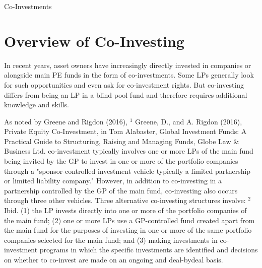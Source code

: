 \documentclass[11pt]{article}
\begin{document}
Co-Investments

\section*{Overview of Co-Investing}
In recent years, asset owners have increasingly directly invested in companies or alongside main PE funds in the form of co-investments. Some LPs generally look for such opportunities and even ask for co-investment rights. But co-investing differs from being an LP in a blind pool fund and therefore requires additional knowledge and skills.

As noted by Greene and Rigdon (2016), ${ }^{1}$ Greene, D., and A. Rigdon (2016), Private Equity Co-Investment, in Tom Alabaster, Global Investment Funds: A Practical Guide to Structuring, Raising and Managing Funds, Globe Law \& Business Ltd. co-investment typically involves one or more LPs of the main fund being invited by the GP to invest in one or more of the portfolio companies through a "sponsor-controlled investment vehicle typically a limited partnership or limited liability company." However, in addition to co-investing in a partnership controlled by the GP of the main fund, co-investing also occurs through three other vehicles. Three alternative co-investing structures involve: ${ }^{2}$ Ibid. (1) the LP invests directly into one or more of the portfolio companies of the main fund; (2) one or more LPs use a GP-controlled fund created apart from the main fund for the purposes of investing in one or more of the same portfolio companies selected for the main fund; and (3) making investments in co-investment programs in which the specific investments are identified and decisions on whether to co-invest are made on an ongoing and deal-bydeal basis.
\end{document}
